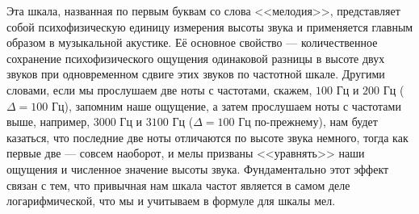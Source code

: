 \documentclass{gost-7-32}
\begin{document}
Эта шкала, названная по первым буквам со слова <<мелодия>>, представляет собой психофизическую единицу измерения высоты звука и применяется главным образом в музыкальной акустике.
Её основное свойство --- количественное сохранение психофизического ощущения одинаковой разницы в высоте двух звуков при одновременном сдвиге этих звуков по частотной шкале.
Другими словами, если мы прослушаем две ноты с частотами, скажем, $100$ Гц и $200$ Гц ($\Delta = 100$ Гц), запомним наше ощущение, а затем прослушаем ноты с частотами выше, например, $3000$ Гц и $3100$ Гц ($\Delta = 100$ Гц по-прежнему), нам будет казаться, что последние две ноты отличаются по высоте звука немного, тогда как первые две --- совсем наоборот, и мелы призваны <<уравнять>> наши ощущения и численное значение высоты звука.
Фундаментально этот эффект связан с тем, что привычная нам шкала частот является в самом деле логарифмической, что мы и учитываем в формуле для шкалы мел.
\end{document}
